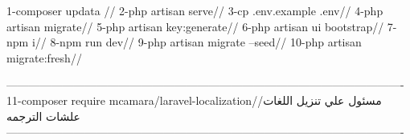 1-composer updata //
2-php artisan serve//
3-cp .env.example .env//
4-php artisan migrate//
5-php artisan key:generate//
6-php artisan ui bootstrap//
7-npm i//
8-npm run dev//
9-php artisan migrate --seed//
10-php artisan migrate:fresh//

----------------------------------------------------------------------------------------------------------
11-composer require mcamara/laravel-localization//مسئول علي تنزيل اللغات علشات الترجمه 
----------------------------------------------------------------------------------------------------------


